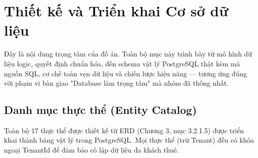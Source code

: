 \section{Thiết kế và Triển khai Cơ sở dữ liệu}

Đây là nội dung trọng tâm của đồ án. Toàn bộ mục này trình bày từ mô hình dữ liệu logic, quyết định chuẩn hóa, đến schema vật lý PostgreSQL thật kèm mã nguồn SQL, cơ chế toàn vẹn dữ liệu và chiến lược hiệu năng — tương ứng đúng với phạm vi bàn giao "Database làm trọng tâm" mà nhóm đã thống nhất.

\subsection{Danh mục thực thể (Entity Catalog)}
Toàn bộ 17 thực thể được thiết kế từ ERD (Chương 3, mục 3.2.1.5) được triển khai thành bảng vật lý trong PostgreSQL. Mọi thực thể (trừ Tenant) đều có khóa ngoại TenantId để đảm bảo cô lập dữ liệu đa khách thuê.

